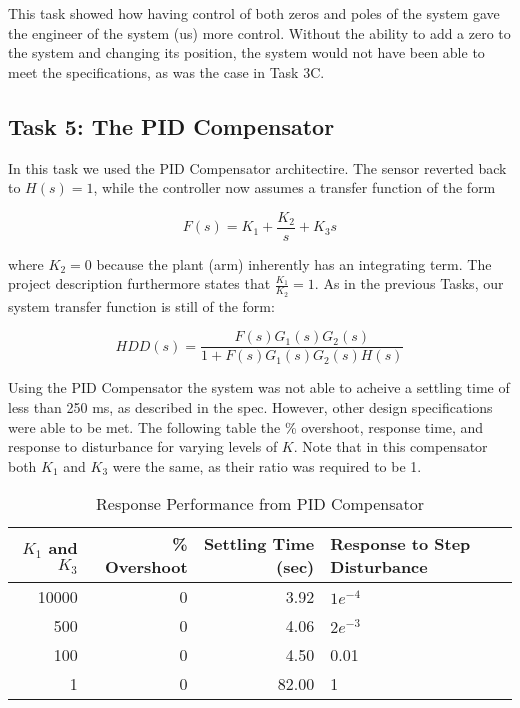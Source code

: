 \documentclass{article}
\begin{document}
This task showed how having control of both zeros and poles of the system gave
the engineer of the system (us) more control. Without the ability to add a
zero to the system and changing its position, the system would not have been
able to meet the specifications, as was the case in Task 3C.

\subsection*{Task 5: The PID Compensator}

In this task we used the PID Compensator architectire. The sensor reverted back
to $H(s) = 1$, while the controller now assumes a transfer function of the form

$$ F(s) = K_1 + \frac{K_2}{s}  + K_3s $$

\noindent
where $K_2 = 0$ because the plant (arm) inherently has an integrating
term. The project description furthermore states that $\frac{K_1}{K_2}
= 1$. As in the previous Tasks, our system transfer function is still
of the form:

$$HDD(s) = \frac{F(s)G_1(s)G_2(s)}{1 + F(s)G_1(s)G_2(s)H(s)}$$

Using the PID Compensator the system was not able to acheive a settling time
of less than 250 ms, as described in the spec. However, other design
specifications were able to be met. The following table the \% overshoot,
response time, and response to disturbance for varying levels of $K$. Note that
in this compensator both $K_1$ and $K_3$ were the same, as their ratio was
required to be 1.

\begin{table}[H]
  \begin{center}
    \begin{tabular}{ | r | r | r | p{5.5cm} |}
    \hline
    $K_1$ and $K_3$ & \textbf{\% Overshoot} &
        \textbf{Settling Time (sec)} & \textbf{Response to Step Disturbance} \\ \hline
    10000 & 0 & 3.92 & $1e^{-4}$ \\ \hline
    500 & 0 & 4.06 & $2e^{-3}$ \\ \hline
    100 & 0 & 4.50 & 0.01 \\ \hline
    1 & 0 & 82.00 & 1 \\ \hline
    \end{tabular}
  \end{center}
  \caption{Response Performance from PID Compensator}
\end{table}
\end{document}
